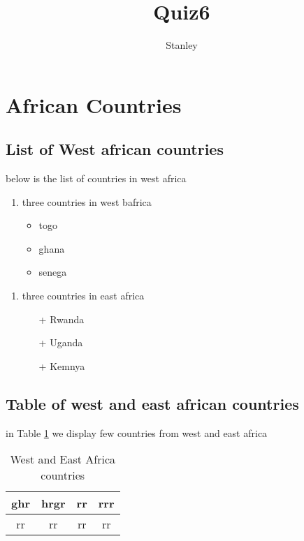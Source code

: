\documentclass[10pt,a4paper]{article}
\author{Stanley}
\title{Quiz6}
\begin{document}
\maketitle
\tableofcontents
{}

\newpage
\section{African Countries}
\subsection{List of West african countries}
below is the list of countries in west africa

\begin{enumerate}
\item three countries in west bafrica
\begin{itemize}
  \item togo
   \item ghana
    \item senega

\end{itemize}

\end{enumerate}

\begin{enumerate}
\item three countries in east africa
\begin{itemize}
\item[+] Rwanda
\item[+] Uganda
\item[+] Kemnya
\end{itemize}
\end{enumerate}

\subsection{Table of west and east african countries}
in  Table \ref{Table 1} we display few countries from west and east africa

\begin{table}[h!] 
\centering
\begin{tabular}{|c|c|c|c|} 
\hline 
ghr & hrgr & rr & rrr \\ 
\hline 
rr & rr & rr & rr\\ 
\hline 
\end{tabular} 
\caption{West and East Africa countries}
\label{Table 1}
\end{table}
\end{document}
